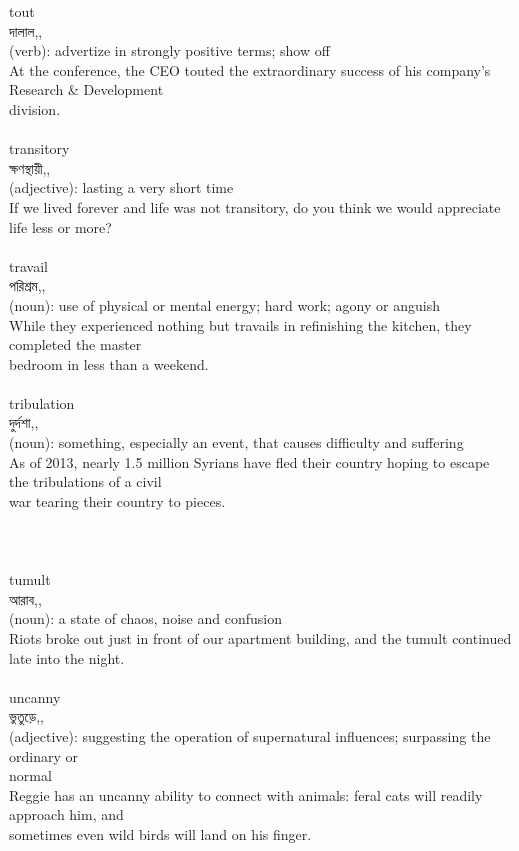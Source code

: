 \documentclass{article}
\begin{document}
{tout}\\
{দালাল,,}\\
{(verb): advertize in strongly positive terms; show off\\At the conference, the CEO touted the extraordinary success of his company's Research \& Development\\division.\\}\\
{transitory}\\
{ক্ষণস্থায়ী,,}\\
{(adjective): lasting a very short time\\If we lived forever and life was not transitory, do you think we would appreciate life less or more?\\}\\
{travail}\\
{পরিশ্রম,,}\\
{(noun): use of physical or mental energy; hard work; agony or anguish\\While they experienced nothing but travails in refinishing the kitchen, they completed the master\\bedroom in less than a weekend.\\}\\
{tribulation}\\
{দুর্দশা,,}\\
{(noun): something, especially an event, that causes difficulty and suffering\\As of 2013, nearly 1.5 million Syrians have fled their country hoping to escape the tribulations of a civil\\war tearing their country to pieces.\\\\                                                                                \\}\\
{tumult}\\
{আরাব,,}\\
{(noun): a state of chaos, noise and confusion\\Riots broke out just in front of our apartment building, and the tumult continued late into the night.\\}\\
{uncanny}\\
{ভুতুড়ে,,}\\
{(adjective): suggesting the operation of supernatural influences; surpassing the ordinary or\\normal\\Reggie has an uncanny ability to connect with animals: feral cats will readily approach him, and\\sometimes even wild birds will land on his finger.\\}\\
\end{document}
